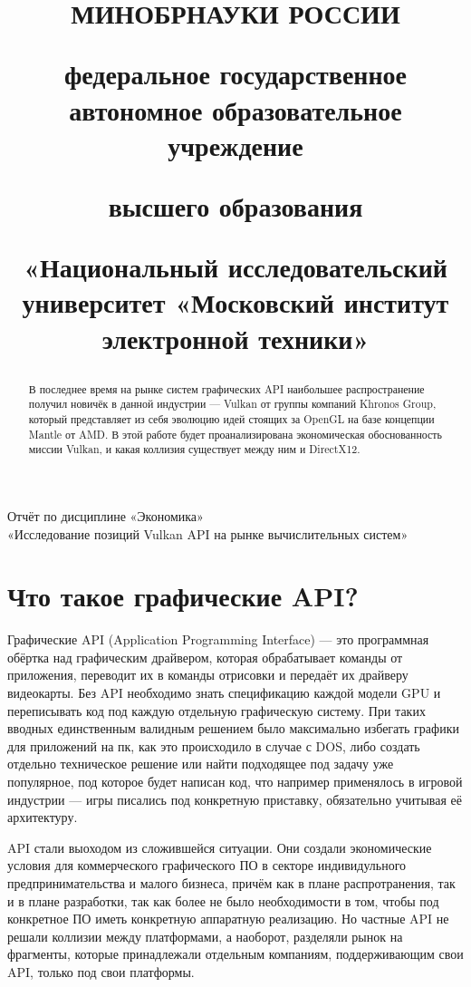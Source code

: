 \documentclass[12pt,a4paper]{article}
\title{
	МИНОБРНАУКИ РОССИИ

	федеральное государственное автономное образовательное учреждение

	высшего образования

	«Национальный исследовательский университет
	«Московский институт электронной техники»
	\vspace{2em}
}
\author{
}
\date{}
\def\Discipline{Экономика}				           %
\def\LabTitle{Исследование позиций Vulkan API на рынке вычислительных систем}	 %
\begin{document}
\maketitle
\thispagestyle{fancy}

\begin{center}
\Large Отчёт по дисциплине «\Discipline»\\
«\LabTitle»
\end{center}


\pagebreak

\fancyhead[R]{\Discipline}
\fancyfoot[C]{\thepage}

\begin{abstract}
	В последнее время на рынке систем графических API наибольшее распространение получил 
	новичёк в данной индустрии — Vulkan от группы компаний Khronos Group, который 
	представляет из себя эволюцию идей стоящих за OpenGL на базе концепции Mantle от AMD. В этой
	работе будет проанализирована экономическая обоснованность миссии Vulkan, и какая 
	коллизия существует между ним и DirectX12.
\end{abstract}

\section{Что такое графические API?}

Графические API (Application Programming Interface) — это программная обёртка над 
графическим драйвером, которая обрабатывает команды от приложения, переводит их в команды 
отрисовки и передаёт их драйверу видеокарты. Без API необходимо знать спецификацию
каждой модели GPU и переписывать код под каждую отдельную графическую систему. При таких вводных 
единственным валидным решением было максимально избегать графики для приложений на пк, 
как это происходило в случае с DOS, либо создать отдельно техническое решение или найти 
подходящее под задачу уже популярное, под которое будет написан код, что например применялось в 
игровой индустрии — игры писались под конкретную приставку, обязательно учитывая её 
архитектуру.

API стали выоходом из сложившейся ситуации. Они создали 
экономические условия для коммерческого графического 
ПО в секторе индивидульного предпринимательства и 
малого бизнеса, причём как в плане распротранения, так и в плане разработки, так как 
более не было необходимости в том, чтобы под конкретное ПО иметь конкретную аппаратную 
реализацию. Но частные
API не решали коллизии между платформами, а наоборот,
разделяли рынок на фрагменты, которые принадлежали
отдельным компаниям, поддерживающим свои API, только
под свои платформы.
\end{document}

